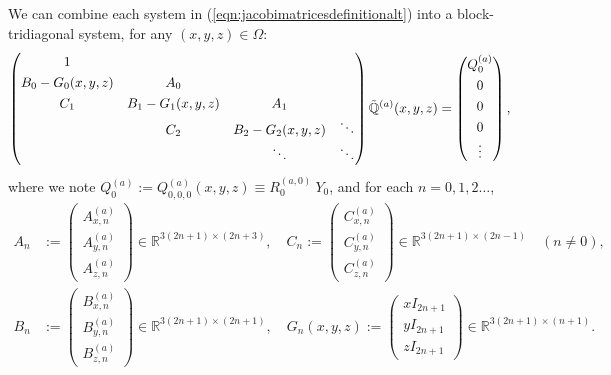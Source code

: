 \documentclass[11pt, oneside]{article}   	%
\newcommand{\R}{\mathbb{R}}
\newcommand{\genjac}{R}
\newcommand{\scop}{Q}
\newcommand{\scopa}{\scop^{(a)}}
\newcommand{\bigscopt}{\mathbb{\tilde{Q}}}
\newcommand{\bigscopta}{\bigscopt^{(a)}}
\newcommand{\ch}{Y}
\begin{document}
We can combine each system in (\ref{eqn:jacobimatricesdefinitionalt}) into a block-tridiagonal system, for any $(x,y,z) \in \Omega$:
\begin{align*}
	\renewcommand\arraystretch{1.3}
	\begin{pmatrix}
		1 & & & \\
		B_0-G_0(x,y,z) & A_0 & & \\
		C_1 & B_1-G_1(x,y,z) & \quad A_1 \quad & \\
		& C_2 & B_2 - G_2(x,y,z)  & \ddots \\
		& & \ddots &\ddots
	\end{pmatrix}
	\bigscopta(x,y,z) =
		\begin{pmatrix}
	 		\scopa_0 \\ 0 \\ 0 \\ 0 \\ \vdots  \\
		\end{pmatrix},
\end{align*}
where we note $\scopa_0 := \scopa_{0,0,0}(x,y,z) \equiv \genjac_0^{(a,0)} \: \ch_0$, and for each $n = 0,1,2\dots$,
\begin{align*}
	A_n &:= 
		\begin{pmatrix}
			A^{(a)}_{x,n} \\
			A^{(a)}_{y,n} \\
			A^{(a)}_{z,n}
		\end{pmatrix} \in \R^{3(2n+1)\times(2n+3)}, \quad
	C_n := 
		\begin{pmatrix}
			C^{(a)}_{x,n} \\
			C^{(a)}_{y,n} \\
			C^{(a)}_{z,n}
		\end{pmatrix} \in \R^{3(2n+1)\times(2n-1)} \quad (n \ne 0), \nonumber \\
	B_n &:= 
		\begin{pmatrix}
			B^{(a)}_{x,n} \\
			B^{(a)}_{y,n} \\
			B^{(a)}_{z,n}
		\end{pmatrix} \in \R^{3(2n+1)\times(2n+1)}, \quad
	G_n(x,y,z) := 
		\begin{pmatrix}
			xI_{2n+1} \\
			yI_{2n+1} \\
			zI_{2n+1}
		\end{pmatrix} \in \R^{3(2n+1)\times(n+1)}.
\end{align*}
 
\end{document}
